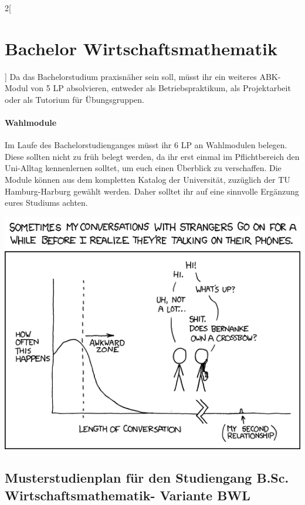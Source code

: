 \begin{multicols}{2}[\section{Bachelor Wirtschaftsmathematik}]
Da das Bachelorstudium praxisnäher sein soll, müsst ihr ein weiteres ABK-Modul
von 5 LP absolvieren, entweder als Betriebspraktikum, als Projektarbeit oder
als Tutorium für Übungsgruppen.

\paragraph{Wahlmodule}

Im Laufe des Bachelorstudienganges müsst ihr 6 LP an Wahlmodulen belegen. Diese
sollten nicht zu früh belegt werden, da ihr erst einmal im Pflichtbereich den
Uni-Alltag kennenlernen solltet, um euch einen Überblick zu verschaffen. Die
Module können aus dem kompletten Katalog der Universität, zuzüglich der TU
Hamburg-Harburg gewählt werden. Daher solltet ihr auf eine sinnvolle Ergänzung
eures Studiums achten.

\begin{center}
\vfill\includegraphics[scale=.55]{comics/476}
\end{center}

\end{multicols}

\clearpage

\subsection{Musterstudienplan für den Studiengang B.Sc.  Wirtschaftsmathematik-
Variante BWL}

